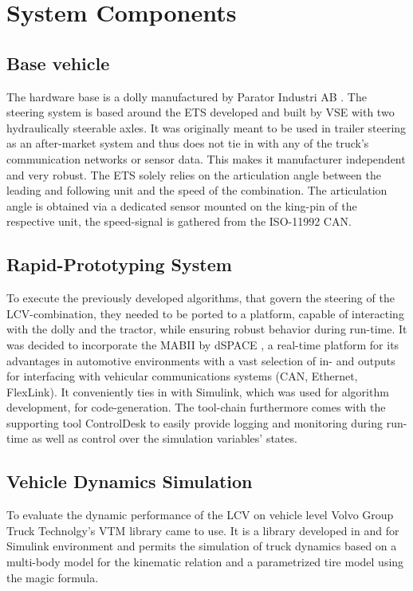 \documentclass[root.tex]{subfiles}
\begin{document}
{\pagestyle{empty}}
\section{System Components}
\label{chap:Hardware-Setup}
\subsection{Base vehicle}
\label{sec:basevehicle}

The hardware base is a dolly manufactured by Parator Industri AB \cite{paratorAB}. The steering system is based around the \gls{ETS} developed and built by \gls{VSE} \cite{vse} with two hydraulically steerable axles. It was originally meant to be used in trailer steering as an after-market system and thus does not tie in with any of the truck's communication networks or sensor data. This makes it manufacturer independent and very robust. The \gls{ETS} solely relies on the articulation angle between the leading and following unit and the speed of the combination. The articulation angle is obtained via a dedicated sensor mounted on the king-pin of the respective unit, the speed-signal is gathered from the ISO-11992 \gls{CAN}. 

\subsection{Rapid-Prototyping System}

To execute the previously developed algorithms, that govern the steering of the \gls{LCV}-combination, they needed to be ported to a platform, capable of interacting with the dolly and the tractor, while ensuring robust behavior during run-time. It was decided to incorporate the \gls{MABII} \cite{mabii} by dSPACE \cite{dspace}, a real-time platform for its advantages in automotive environments with a vast selection of in- and outputs for interfacing with vehicular communications systems (\gls{CAN}, Ethernet, FlexLink). It conveniently ties in with Simulink, which was used for algorithm development, for code-generation. %
 The tool-chain furthermore comes with the supporting tool ControlDesk to easily provide logging and monitoring during run-time as well as control over the simulation variables' states.


\subsection{Vehicle Dynamics Simulation}
To evaluate the dynamic performance of the \gls{LCV} on vehicle level Volvo Group Truck Technolgy's \gls{VTM} library came to use. It is a library developed in and for Simulink environment and permits the simulation of truck dynamics based on a multi-body model for the kinematic relation and a parametrized tire model using the magic formula.
\end{document}
